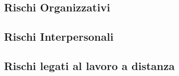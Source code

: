 	\subsection{Rischi Organizzativi}
	\def\productquality{
		{
        		Calcolo
			Tempistiche e Costi
			RO1,
        		Causa RT1 le tempistiche potrebbero allungarsi dilatandone anche il costo, 
        		è responsabilità di ogni membro del gruppo comunicare le problematiche relative alle proprie task e il gruppo provvederà ad aiutare in modo che siano rispettate le tempistiche e i costi,
        		Occorrenza: Alta 
			Pericolosità: Alta,
        		All'insorgere di tali problematiche, nel caso in cui l'intervento di uno o più membri del gruppo non sia sufficente a far rispettare le scadenze è compito del responsabile comunicare al committente le problematiche riscontrate
    		},
	}
	
	\subsection{Rischi Interpersonali}
	\subsection{Rischi legati al lavoro a distanza}